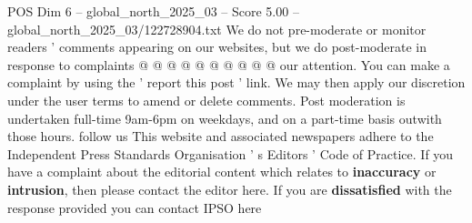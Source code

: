 \begin{textsample}{POS Dim 6 – global\_north\_2025\_03 – Score 5.00 – global\_north\_2025\_03/122728904.txt}
We do not pre-moderate or monitor readers ' comments appearing on our websites, but we do post-moderate in response to complaints @ @ @ @ @ @ @ @ @ @ our attention.
You can make a complaint by using the ' report this post ' link.
We may then apply our discretion under the user terms to amend or delete comments.
Post moderation is undertaken full-time 9am-6pm on weekdays, and on a part-time basis outwith those hours. follow us This website and associated newspapers adhere to the Independent Press Standards Organisation ' s Editors ' Code of Practice.
If you have a complaint about the editorial content which relates to \textbf{inaccuracy} or \textbf{intrusion}, then please contact the editor here.
If you are \textbf{dissatisfied} with the response provided you can contact IPSO here

\end{textsample}
